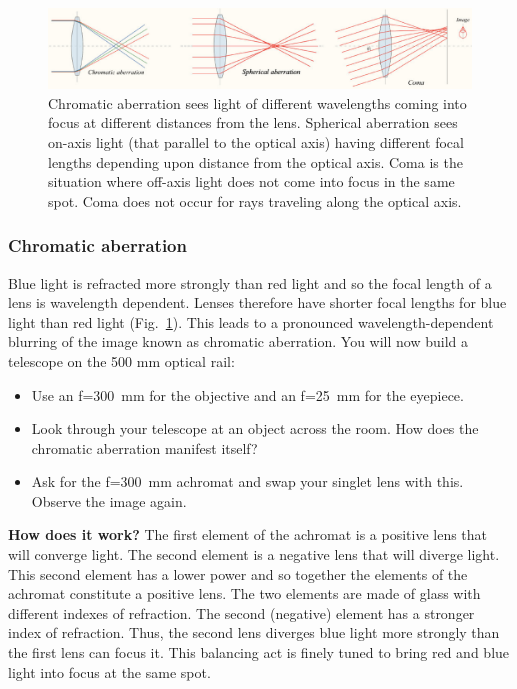 \documentclass[a4paper]{report}
\begin{document}
\begin{figure}[h]
\center
\includegraphics[width=6in]{aberrations.eps}
\caption{ 
Chromatic aberration sees light of different wavelengths coming into focus at different distances from the lens.
Spherical aberration sees on-axis light (that parallel to the optical axis) having different focal lengths depending upon distance from the optical axis. 
Coma is the situation where off-axis light does not come into focus in the same spot. Coma does not occur for rays traveling along the optical axis.}
\label{fig:aberrations}
\end{figure}



\subsubsection{Chromatic aberration}
Blue light is refracted more strongly than red light and so the focal length of a lens is wavelength dependent. 
Lenses therefore have shorter focal lengths for blue light than red light (Fig.~\ref{fig:aberrations}).
This leads to a pronounced wavelength-dependent blurring of the image known as chromatic aberration. 
You will now build a telescope on the 500 mm optical rail:
\begin{itemize}
\item Use an f=300~mm for the objective and an f=25~mm for the eyepiece. 
\item Look through your telescope at an object across the room. How does the chromatic aberration manifest itself?
\item Ask for the f=300~mm achromat and swap your singlet lens with this. Observe the image again.
\end{itemize}

\textbf{How does it work?} 
The first element of the achromat is a positive lens that will converge light. 
The second element is a negative lens that will diverge light.
This second element has a lower power and so together the elements of the achromat constitute a positive lens. 
The two elements are made of glass with different indexes of refraction. 
The second (negative) element has a stronger index of refraction. 
Thus, the second lens diverges blue light more strongly than the first lens can focus it.
This balancing act is finely tuned to bring red and blue light into focus at the same spot.
\end{document}
